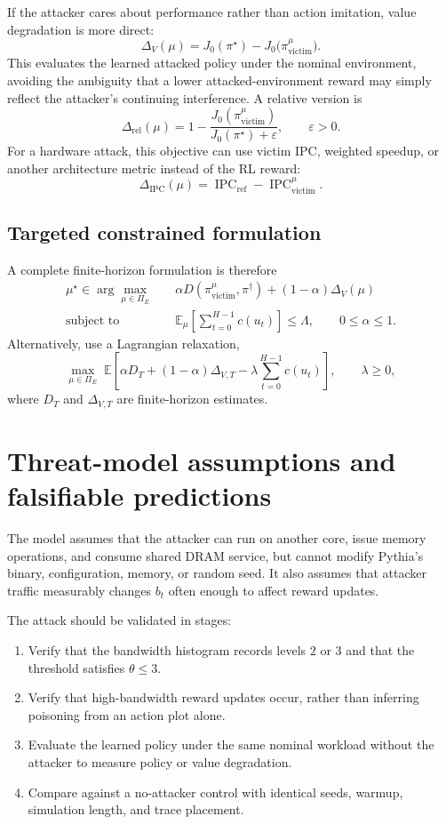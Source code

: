 \documentclass[11pt]{article}
\newcommand{\Eexp}{\mathbb{E}}
\newcommand{\piopt}{\pi^{\star}}
\newcommand{\pitar}{\pi^{\dagger}}
\begin{document}
If the attacker cares about performance rather than action imitation, value degradation is more direct:
\[
 \Delta_V(\mu)
 = J_0(\piopt) - J_0\bigl(\pi_{\mathrm{victim}}^{\mu}\bigr).
\]
This evaluates the learned attacked policy under the nominal environment, avoiding the ambiguity that a lower attacked-environment reward may simply reflect the attacker's continuing interference. A relative version is
\[
 \Delta_{\mathrm{rel}}(\mu)
 = 1 - \frac{J_0(\pi_{\mathrm{victim}}^{\mu})}
              {J_0(\piopt)+\varepsilon},
 \qquad \varepsilon>0.
\]
For a hardware attack, this objective can use victim IPC, weighted speedup, or another architecture metric instead of the RL reward:
\[
 \Delta_{\mathrm{IPC}}(\mu)
 = \operatorname{IPC}_{\mathrm{ref}}
   -\operatorname{IPC}_{\mathrm{victim}}^{\mu}.
\]

\subsection{Targeted constrained formulation}

A complete finite-horizon formulation is therefore
\begin{align}
 \mu^{\star} \in \arg\max_{\mu\in\Pi_E}
 &\quad
 \alpha D\!\left(\pi_{\mathrm{victim}}^{\mu},\pitar\right)
 +(1-\alpha)\Delta_V(\mu)\\
 \text{subject to}
 &\quad
 \Eexp_{\mu}\left[\sum_{t=0}^{H-1}c(u_t)\right]\leq\Lambda,
 \qquad 0\leq\alpha\leq 1.
\end{align}
Alternatively, use a Lagrangian relaxation,
\[
 \max_{\mu\in\Pi_E}
 \;\Eexp\left[
   \alpha D_T +(1-\alpha)\Delta_{V,T}
   -\lambda\sum_{t=0}^{H-1}c(u_t)
 \right],
 \qquad \lambda\geq 0,
\]
where $D_T$ and $\Delta_{V,T}$ are finite-horizon estimates.

\section{Threat-model assumptions and falsifiable predictions}

The model assumes that the attacker can run on another core, issue memory operations, and consume shared DRAM service, but cannot modify Pythia's binary, configuration, memory, or random seed. It also assumes that attacker traffic measurably changes $b_t$ often enough to affect reward updates.

The attack should be validated in stages:
\begin{enumerate}[leftmargin=*]
  \item Verify that the bandwidth histogram records levels $2$ or $3$ and that the threshold satisfies $\theta\leq 3$.
  \item Verify that high-bandwidth reward updates occur, rather than inferring poisoning from an action plot alone.
  \item Evaluate the learned policy under the same nominal workload without the attacker to measure policy or value degradation.
  \item Compare against a no-attacker control with identical seeds, warmup, simulation length, and trace placement.
\end{enumerate}
\end{document}
